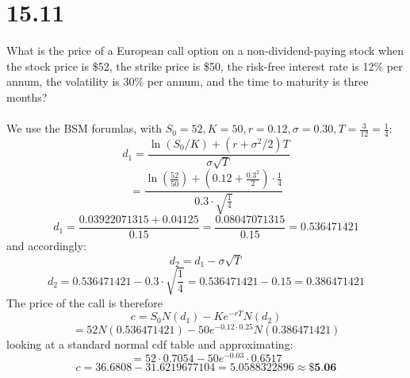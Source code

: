 \documentclass{article}
\begin{document}
{\Large 

\section*{15.11}
What is the price of a European call option on a non-dividend-paying stock when the stock price is \$52, the strike price is \$50, the risk-free interest rate is 12\% per annum, the volatility is 30\% per annum, and the time to maturity is three months? \\ \\
We use the BSM forumlas, with \(S_0 = 52, K = 50, r = 0.12, \sigma = 0.30, T = \frac{3}{12} = \frac{1}{4}\):
\[
  d_1 = \frac{\ln(S_0 / K) + (r + \sigma^2 / 2)T}{\sigma \sqrt{T}}
\]
\[
  = \frac{\ln(\frac{52}{50}) + (0.12 + \frac{0.3^2}{2}) \cdot \frac{1}{4}}{0.3 \cdot \sqrt{\frac{1}{4}}}
\]
\[
  d_1 = \frac{0.03922071315 + 0.04125}{0.15} = \frac{0.08047071315}{0.15} = 0.536471421
\]
and accordingly:
\[
  d_2 = d_1 - \sigma \sqrt{T}
\]
\[
  d_2 = 0.536471421 - 0.3 \cdot \sqrt{\frac{1}{4}} = 0.536471421 - 0.15 = 0.386471421
\]
The price of the call is therefore
\[
  c = S_0 N(d_1) - Ke^{-rT} N(d_2)
\]
\[
  = 52 N(0.536471421) - 50 e^{-0.12 \cdot 0.25} N(0.386471421)
\]
looking at a standard normal cdf table and approximating: 
\[
  = 52 \cdot 0.7054 - 50 e^{-0.03} \cdot 0.6517
\]
\[
  c = 36.6808 - 31.6219677104 = 5.0588322896 \approx \boxed{\textbf{\$5.06}}
\]

}
\end{document}
